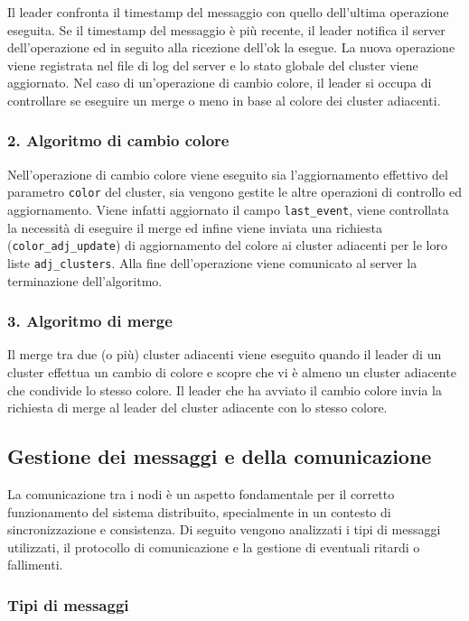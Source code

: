 \documentclass[12pt, a4paper]{report}
\begin{document}
Il leader confronta il timestamp del messaggio con quello dell'ultima operazione eseguita. Se il timestamp del messaggio \`e pi\`u recente, il leader notifica il server dell'operazione ed in seguito alla ricezione dell'ok la esegue. La nuova operazione viene registrata nel file di log del server e lo stato globale del cluster viene aggiornato. Nel caso di un'operazione di cambio colore, il leader si occupa di controllare se eseguire un merge o meno in base al colore dei cluster adiacenti.

\subsubsection{2. Algoritmo di cambio colore}
\label{subsec:change_color}
Nell'operazione di cambio colore viene eseguito sia l'aggiornamento effettivo del parametro \texttt{color} del cluster, sia vengono gestite le altre operazioni di controllo ed aggiornamento. Viene infatti aggiornato il campo \texttt{last\_event}, viene controllata la necessit\`a di eseguire il merge ed infine viene inviata una richiesta (\texttt{color\_adj\_update}) di aggiornamento del colore ai cluster adiacenti per le loro liste \texttt{adj\_clusters}. Alla fine dell'operazione viene comunicato al server la terminazione dell'algoritmo.

\subsubsection{3. Algoritmo di merge}
\label{subsec:merge}
Il merge tra due (o pi\`u) cluster adiacenti viene eseguito quando il leader di un cluster effettua un cambio di colore e scopre che vi \`e almeno un cluster adiacente che condivide lo stesso colore. Il leader che ha avviato il cambio colore invia la richiesta di merge al leader del cluster adiacente con lo stesso colore.

\subsection{Gestione dei messaggi e della comunicazione}\label{sec:gestione_messaggi}

La comunicazione tra i nodi \`e un aspetto fondamentale per il corretto funzionamento del sistema distribuito, specialmente in un contesto di sincronizzazione e consistenza. Di seguito vengono analizzati i tipi di messaggi utilizzati, il protocollo di comunicazione e la gestione di eventuali ritardi o fallimenti.

\subsubsection{Tipi di messaggi}
\label{sec:tipi_di_messaggi}
\end{document}
